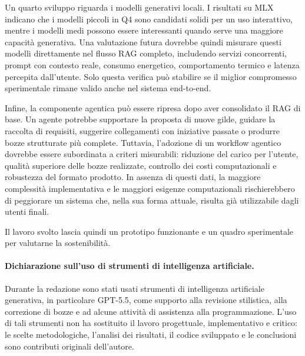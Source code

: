 Un quarto sviluppo riguarda i modelli generativi locali. I risultati su MLX
indicano che i modelli piccoli in Q4 sono candidati solidi per un uso
interattivo, mentre i modelli medi possono essere interessanti quando serve una
maggiore capacità generativa. Una valutazione futura dovrebbe quindi misurare
questi modelli direttamente nel flusso RAG completo, includendo servizi
concorrenti, prompt con contesto reale, consumo energetico, comportamento
termico e latenza percepita dall'utente. Solo questa verifica può stabilire se
il miglior compromesso sperimentale rimane valido anche nel sistema end-to-end.

Infine, la componente agentica può essere ripresa dopo aver consolidato il RAG
di base. Un agente potrebbe supportare la proposta di nuove gilde, guidare la
raccolta di requisiti, suggerire collegamenti con iniziative passate o produrre
bozze strutturate più complete. Tuttavia, l'adozione di un workflow agentico
dovrebbe essere subordinata a criteri misurabili: riduzione del carico per
l'utente, qualità superiore delle bozze realizzate, controllo dei costi computazionali e
robustezza del formato prodotto. In assenza di questi dati, la maggiore
complessità implementativa e le maggiori esigenze computazionali rischierebbero di peggiorare un sistema che, 
nella sua forma attuale, risulta già utilizzabile dagli utenti finali.

Il lavoro svolto lascia quindi un prototipo funzionante e un quadro sperimentale
per valutarne la sostenibilità.

\paragraph{Dichiarazione sull'uso di strumenti di intelligenza artificiale.}
Durante la redazione sono stati usati strumenti di intelligenza artificiale
generativa, in particolare GPT-5.5, come supporto alla revisione stilistica,
alla correzione di bozze e ad alcune attività di assistenza alla
programmazione. L'uso di tali strumenti non ha sostituito il lavoro
progettuale, implementativo e critico: le scelte metodologiche, l'analisi dei
risultati, il codice sviluppato e le conclusioni sono contributi originali
dell'autore.
